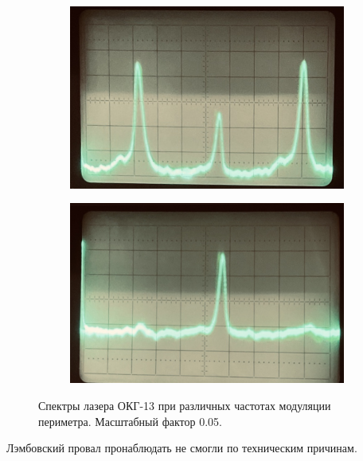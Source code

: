 \documentclass[12pt, russian, a4paper]{article}
\begin{document}
	\begin{figure} 
    	\centering
    	\begin{subfigure}[tb]{.49\textwidth}
			\centering
		 	\includegraphics[width=\textwidth]{../images/4.PNG}
			\caption{}
			\label{fig:0.05-4}
		\end{subfigure}
    	\hfill
    	\begin{subfigure}[tb]{.49\textwidth}
			\centering
			\includegraphics[width=\textwidth]{../images/5.PNG}
			\caption{}
			\label{fig:0.05-5}
		\end{subfigure}
     	\caption{Спектры лазера ОКГ-13 при различных частотах модуляции периметра. Масштабный фактор 0.05.}
     	\label{fig:0.05}
	\end{figure}

	Лэмбовский провал пронаблюдать не смогли по техническим причинам.

\end{document}
